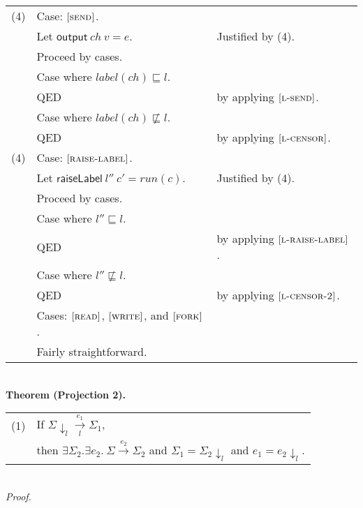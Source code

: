 \documentclass{article}
\newcommand{\rn}[1]{\text{\textsc{[#1]}}}
\newcommand{\ssteparrow}[1]{\overset{#1}{\longrightarrow}}
\newcommand{\sstep}[3]{#2\ssteparrow{#1}#3}
\newcommand{\lssteparrow}[2]{\overset{#2}{\underset{#1}{\longrightarrow}}}
\newcommand{\lsstep}[4]{#3\lssteparrow{#1}{#2}#4}
\newcommand{\opraiselabel}[2]{\textsf{raiseLabel}~#1~#2}
\newcommand{\evsend}[2]{\textsf{output}~#1~#2}
\newcommand{\proj}[2]{#1{\downarrow_{#2}}}
\begin{document}
\begin{tabular}{l@{$\qquad$}l@{\qquad}l}
\\
  (4)   & \z \z Case: $\rn{send}$.
\\
        & \z \z \z Let $\evsend{ch}{v} = e$.
        & Justified by (4).
\\
        & \z \z \z Proceed by cases.
\\
        & \z \z \z Case where $label(ch)\sqsubseteq l$.
\\
        & \z \z \z \z QED
        & by applying $\rn{l-send}$.
\\
        & \z \z \z Case where $label(ch)\not\sqsubseteq l$.
\\
        & \z \z \z \z QED
        & by applying $\rn{l-censor}$.
\\
  (4)   & \z \z Case: $\rn{raise-label}$.
\\
        & \z \z \z Let $\opraiselabel{l''}{c'} = run(c)$.
        & Justified by (4).
\\
        & \z \z \z Proceed by cases.
\\
        & \z \z \z Case where $l''\sqsubseteq l$.
\\
        & \z \z \z \z QED
        & by applying $\rn{l-raise-label}$.
\\
        & \z \z \z Case where $l''\not\sqsubseteq l$.
\\
        & \z \z \z \z QED
        & by applying $\rn{l-censor-2}$.
\\
        & \z \z Cases: $\rn{read}$, $\rn{write}$, and $\rn{fork}$.
\\
        & \z \z \z Fairly straightforward.
\end{tabular}
\\
\textbf{Theorem (Projection 2).}
\\
\begin{tabular}{l@{$\qquad$}l}
  (1) & If $\lsstep{l}{e_1}{\proj{\Sigma}{l}}{\Sigma_1}$,
\\
      & then $\exists \Sigma_2.\exists e_2.~\sstep{e_2}{\Sigma}{\Sigma_2}$
        and $\Sigma_1 = \proj{\Sigma_2}{l}$
        and $e_1 = \proj{e_2}{l}$.
\end{tabular}
\\
\textit{Proof.}
\\
\end{document}
